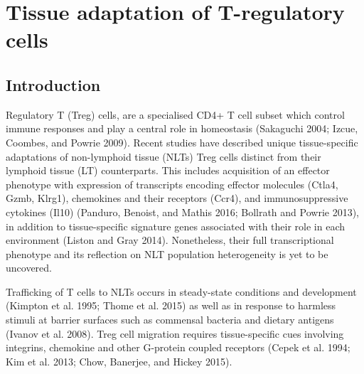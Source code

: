 
\chapter{Tissue adaptation of T-regulatory cells} \label{chap:Treg}

\ifpdf
    \graphicspath{{Chapter2/Figs/Raster/}{Chapter2/Figs/PDF/}{Chapter2/Figs/}}
\else
    \graphicspath{{Chapter2/Figs/Vector/}{Chapter2/Figs/}}
\fi


\section[Introduction]{Introduction}
\label{section2.1}

Regulatory T (Treg) cells, are a specialised CD4+ T cell subset which control immune responses and play a central role in homeostasis (Sakaguchi 2004; Izcue, Coombes, and Powrie 2009). Recent studies have described unique tissue-specific adaptations of non-lymphoid tissue (NLTs) Treg cells distinct from their lymphoid tissue (LT) counterparts. This includes acquisition of an effector phenotype with expression of transcripts encoding effector molecules (Ctla4, Gzmb, Klrg1), chemokines and their receptors (Ccr4), and immunosuppressive cytokines (Il10) (Panduro, Benoist, and Mathis 2016; Bollrath and Powrie 2013), in addition to tissue-specific signature genes associated with their role in each environment (Liston and Gray 2014). Nonetheless, their full transcriptional phenotype and its reflection on NLT population heterogeneity is yet to be uncovered.

Trafficking of T cells to NLTs occurs in steady-state conditions and development (Kimpton et al. 1995; Thome et al. 2015) as well as in response to harmless stimuli at barrier surfaces such as commensal bacteria and dietary antigens (Ivanov et al. 2008). Treg cell migration requires tissue-specific cues involving integrins, chemokine and other G-protein coupled receptors (Cepek et al. 1994; Kim et al. 2013; Chow, Banerjee, and Hickey 2015).

